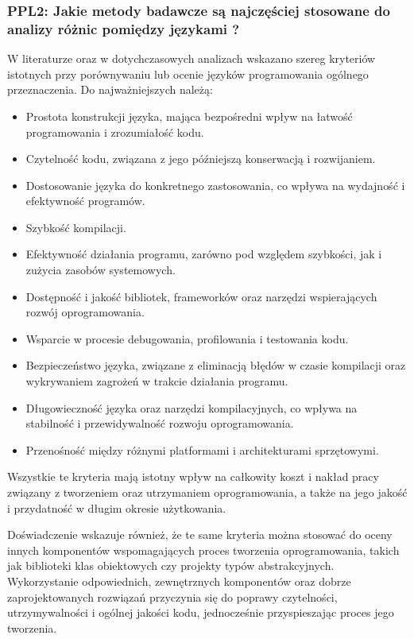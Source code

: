 \subsubsection{PPL2: Jakie metody badawcze są najczęściej stosowane do analizy różnic pomiędzy językami ?}
W literaturze oraz w dotychczasowych analizach \cite{LanguageComparison_1,LanguageComparison_2,LanguageComparison_3,LanguageComparison_4} wskazano szereg kryteriów istotnych przy porównywaniu lub ocenie języków programowania ogólnego przeznaczenia. Do najważniejszych należą: 
    \begin{itemize}
        \item Prostota konstrukcji języka, mająca bezpośredni wpływ na łatwość programowania i zrozumiałość kodu.
        \item Czytelność kodu, związana z jego późniejszą konserwacją i rozwijaniem.
        \item Dostosowanie języka do konkretnego zastosowania, co wpływa na wydajność i efektywność programów.
        \item Szybkość kompilacji.
        \item Efektywność działania programu, zarówno pod względem szybkości, jak i zużycia zasobów systemowych.
        \item Dostępność i jakość bibliotek, frameworków oraz narzędzi wspierających rozwój oprogramowania.
        \item Wsparcie w procesie debugowania, profilowania i testowania kodu.
        \item Bezpieczeństwo języka, związane z eliminacją błędów w czasie kompilacji oraz wykrywaniem zagrożeń w trakcie działania programu.
        \item Długowieczność języka oraz narzędzi kompilacyjnych, co wpływa na stabilność i przewidywalność rozwoju oprogramowania.
        \item Przenośność między różnymi platformami i architekturami sprzętowymi.
    \end{itemize}
    Wszystkie te kryteria mają istotny wpływ na całkowity koszt i nakład pracy związany z tworzeniem oraz utrzymaniem oprogramowania, a także na jego jakość i przydatność w długim okresie użytkowania.

    Doświadczenie wskazuje również, że te same kryteria można stosować do oceny innych komponentów wspomagających proces tworzenia oprogramowania, takich jak biblioteki klas obiektowych czy projekty typów abstrakcyjnych. Wykorzystanie odpowiednich, zewnętrznych komponentów oraz dobrze zaprojektowanych rozwiązań przyczynia się do poprawy czytelności, utrzymywalności i ogólnej jakości kodu, jednocześnie przyspieszając proces jego tworzenia.

